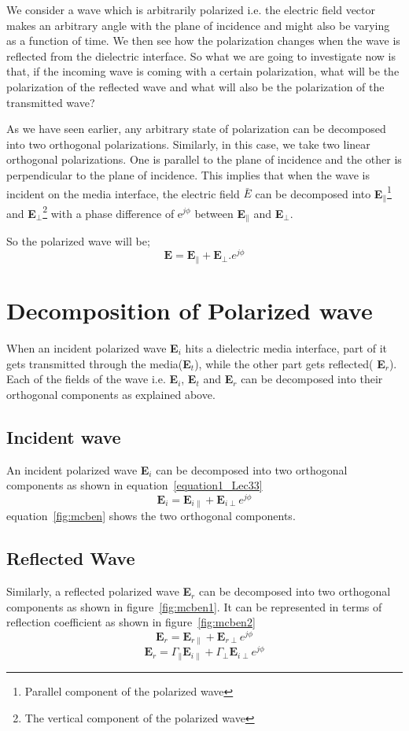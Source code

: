 We consider a wave which is arbitrarily polarized i.e. the electric field vector makes an arbitrary angle with the plane of incidence and might also be varying as a function of time. We then see how the polarization changes when the wave is reflected from the dielectric interface. So what we are going to investigate now is that, if the incoming wave is coming with a certain polarization, what will be the polarization of the reflected wave and what will also be the polarization of the transmitted wave?

As we have seen earlier, any arbitrary state of polarization can be decomposed into two orthogonal polarizations. Similarly, in this case, we take two linear orthogonal polarizations. One is parallel to the plane of incidence and the other is perpendicular to the plane of incidence. This implies that when the wave is incident on the media interface, the electric field \textbf{$\bar{E}$} can be decomposed into \textbf{E}$_\parallel$\footnote{
Parallel component of the polarized wave
} and \textbf{E}$_\perp$\footnote{
The vertical component of the polarized wave
} with a phase difference of e$^{j\phi}$ between \textbf{E}$_\parallel$ and \textbf{E}$_\perp$.

So the polarized wave will be; $$\textbf{E} = \textbf{E}_\parallel + \textbf{E}_\perp.e^{j\phi}$$	

\section{Decomposition of Polarized wave}	
When an incident polarized wave \textbf{E$_i$} hits a dielectric media interface, part of it gets transmitted through the media(\textbf{E$_t$}), while the other part gets reflected( \textbf{E$_r$}). Each of the fields of the wave i.e. \textbf{E$_i$}, \textbf{E$_t$} and \textbf{E$_r$} can be decomposed into their orthogonal components as explained above.	
\subsection{Incident wave}	
An incident polarized wave \textbf{E$_i$} can be decomposed into two orthogonal components as shown in equation~\ref{equation1_Lec33}	
\begin{equation}
\textbf{E}_i = \textbf{E}_{i\parallel} + \textbf{E}_{i\perp} e^{j\phi}
\label{equation1_Lec33}
\end{equation}
equation~\ref{fig:mcben} shows the two orthogonal components.	
\subsection{Reflected Wave}
Similarly, a reflected polarized wave \textbf{E$_r$} can be decomposed into two orthogonal components as shown in figure~\ref{fig:mcben1}. It can be represented in terms of reflection coefficient as shown in figure~\ref{fig:mcben2}
\begin{equation}
\textbf{E}_r = \textbf{E}_{r\parallel} + \textbf{E}_{r\perp} e^{j\phi}
\end{equation}	
\begin{equation}
\textbf{E}_r = \Gamma_\parallel \textbf{E}_{i\parallel} + \Gamma_\perp \textbf{E}_{i\perp} e^{j\phi}
\end{equation}	
